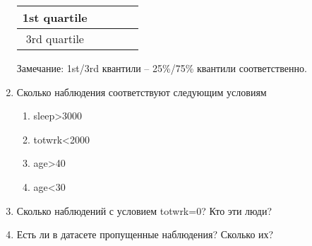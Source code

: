 \begin{exercise}
\begin{enumerate}
\begin{center}
\begin{tabular}{|c|c|c|c|c|}
			1st quartile & & & & \\ \hline
			3rd quartile & & & & \\ \hline
		\end{tabular}
	\end{center}
	Замечание: 1st/3rd квантили -- 25\%/75\% квантили соответственно.
	\item Сколько наблюдения соответствуют следующим условиям
	\begin{enumerate}
		\item sleep>3000
		\item totwrk<2000
		\item age>40
		\item age<30
	\end{enumerate}
	\item Сколько наблюдений с условием totwrk=0? 
	Кто эти люди?
	\item Есть ли в датасете пропущенные наблюдения?
	Сколько их?
\end{enumerate}
\end{exercise}

